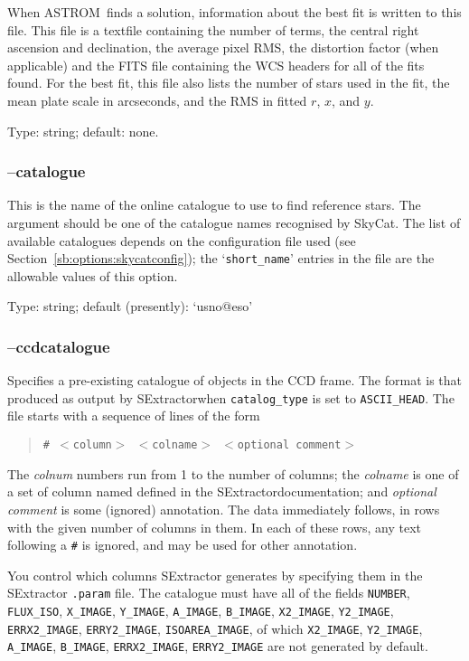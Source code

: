 \documentclass[twoside,11pt]{article}
\newcommand{\htmladdnormallink}[2]{#1}
\newcommand{\xref}[3]{#1}
\newcommand{\xlabel}[1]{}
\newcommand{\ASTROM}{{\footnotesize ASTROM}\normalsize}
\newcommand{\SExtractor}{\xref{{\footnotesize SExtractor}}{sun226}}
\newcommand{\SkyCat}{\htmladdnormallink{SkyCat}{http://archive.eso.org/skycat/}}
\begin{document}
When \ASTROM\ finds a solution, information about the best fit is written to
this file. This file is a textfile containing the number of terms, the central
right ascension and declination, the average pixel RMS, the distortion factor
(when applicable) and the FITS file containing the WCS headers for all of the
fits found. For the best fit, this file also lists the number of stars used in
the fit, the mean plate scale in arcseconds, and the RMS in fitted $r$, $x$,
and $y$.

Type: string; default: none.

\subsubsection{\xlabel{sb_options_catalogue}--catalogue\label{sb:options:catalogue}}

This is the name of the online catalogue to use to find reference stars.  The
argument should be one of the catalogue names recognised by \SkyCat.  The list
of available catalogues depends on the configuration file used (see
Section~\ref{sb:options:skycatconfig}); the `\texttt{short\_name}' entries in
the file are the allowable values of this option.

Type: string; default (presently): `usno@eso'

\subsubsection{\xlabel{sb_options_ccdcatalogue}--ccdcatalogue\label{sb:options:ccdcatalogue}}

Specifies a pre-existing catalogue of objects in the CCD frame. The format is
that produced as output by \SExtractor\ when \texttt{catalog\_type} is set to
\texttt{ASCII\_HEAD}. The file starts with a sequence of lines of the form
\begin{quote}
\texttt{\# $<$column$>$ $<$colname$>$ $<$optional comment$>$}
\end{quote}

The \textit{colnum} numbers run from 1 to the number of columns; the
\textit{colname} is one of a set of column named defined in the \SExtractor\
documentation; and \textit{optional comment} is some (ignored) annotation.
The data immediately follows, in rows with the given number of columns in
them.  In each of these rows, any text following a \texttt{\#} is ignored, and
may be used for other annotation.

You control which columns SExtractor generates by specifying them in the
SExtractor \texttt{.param} file.  The catalogue must have all of the fields
\texttt{NUMBER}, \texttt{FLUX\_ISO}, \texttt{X\_IMAGE}, \texttt{Y\_IMAGE},
\texttt{A\_IMAGE}, \texttt{B\_IMAGE}, \texttt{X2\_IMAGE}, \texttt{Y2\_IMAGE},
\texttt{ERRX2\_IMAGE}, \texttt{ERRY2\_IMAGE}, \texttt{ISOAREA\_IMAGE}, of which
\texttt{X2\_IMAGE}, \texttt{Y2\_IMAGE}, \texttt{A\_IMAGE}, \texttt{B\_IMAGE},
\texttt{ERRX2\_IMAGE}, \texttt{ERRY2\_IMAGE} are not generated by default.
\end{document}
